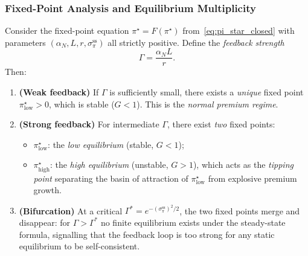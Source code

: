 \subsubsection{Fixed-Point Analysis and Equilibrium Multiplicity}
\label{sec:fixed_point}

\begin{theorem}
  \label{thm:three_equilibria}
  Consider the fixed-point equation $\pi^\star = F(\pi^\star)$
  from~\eqref{eq:pi_star_closed} with parameters
  $(\alpha_N, L, r, \sigma_\pi^{\mathrm{ss}})$ all strictly positive.
  Define the \emph{feedback strength}
  \begin{equation}
    \label{eq:feedback_strength}
    \Gamma = \frac{\alpha_N L}{r}.
  \end{equation}
  Then:
  \begin{enumerate}
    \item \textbf{(Weak feedback)} If $\Gamma$ is sufficiently small, there
      exists a \emph{unique} fixed point $\pi^\star_{\mathrm{low}} > 0$,
      which is stable ($G < 1$).  This is the \emph{normal premium regime}.

    \item \textbf{(Strong feedback)} For intermediate $\Gamma$, there
      exist \emph{two} fixed points:
      \begin{itemize}
        \item $\pi^\star_{\mathrm{low}}$: the \emph{low equilibrium}
              (stable, $G < 1$);
        \item $\pi^\star_{\mathrm{high}}$: the \emph{high equilibrium}
              (unstable, $G > 1$), which acts as the \emph{tipping point}
              separating the basin of attraction of $\pi^\star_{\mathrm{low}}$
              from explosive premium growth.
      \end{itemize}

    \item \textbf{(Bifurcation)} At a critical
      $\Gamma^* = e^{-(\sigma_\pi^{\mathrm{ss}})^2/2}$, the two fixed points
      merge and disappear: for $\Gamma > \Gamma^*$ no finite equilibrium
      exists under the steady-state formula, signalling that the feedback
      loop is too strong for any static equilibrium to be self-consistent.
  \end{enumerate}
\end{theorem}

